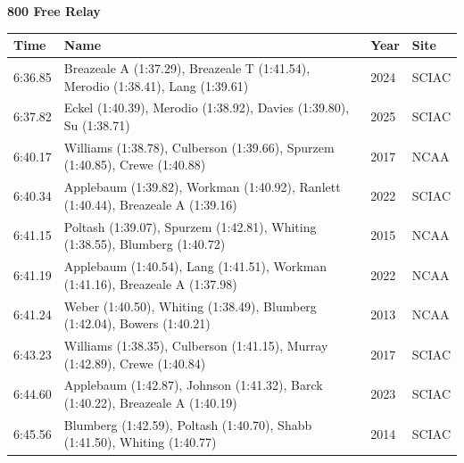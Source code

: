 \noindent\begin{minipage}[t]{0.98\textwidth}
\centering
\textbf{\textcolor{teamprimary}{800 Free Relay}}\par
\vspace{0.5em}
\centering
\small
\renewcommand{\arraystretch}{1.0}
\setlength{\tabcolsep}{4pt}
\begin{tabular}{@{}p{2.7cm}p{4.3cm}p{1.6cm}p{2.7cm}@{}}
\toprule
\textbf{Time} & \textbf{Name} & \textbf{Year} & \textbf{Site} \\
\midrule
6:36.85 & Breazeale A (1:37.29), Breazeale T (1:41.54), Merodio (1:38.41), Lang (1:39.61) & 2024 & SCIAC \\
6:37.82 & Eckel (1:40.39), Merodio (1:38.92), Davies (1:39.80), Su (1:38.71) & 2025 & SCIAC \\
6:40.17 & Williams (1:38.78), Culberson (1:39.66), Spurzem (1:40.85), Crewe (1:40.88) & 2017 & NCAA \\
6:40.34 & Applebaum (1:39.82), Workman (1:40.92), Ranlett (1:40.44), Breazeale A (1:39.16) & 2022 & SCIAC \\
6:41.15 & Poltash (1:39.07), Spurzem (1:42.81), Whiting (1:38.55), Blumberg (1:40.72) & 2015 & NCAA \\
6:41.19 & Applebaum (1:40.54), Lang (1:41.51), Workman (1:41.16), Breazeale A (1:37.98) & 2022 & NCAA \\
6:41.24 & Weber (1:40.50), Whiting (1:38.49), Blumberg (1:42.04), Bowers (1:40.21) & 2013 & NCAA \\
6:43.23 & Williams (1:38.35), Culberson (1:41.15), Murray (1:42.89), Crewe (1:40.84) & 2017 & SCIAC \\
6:44.60 & Applebaum (1:42.87), Johnson (1:41.32), Barck (1:40.22), Breazeale A (1:40.19) & 2023 & SCIAC \\
6:45.56 & Blumberg (1:42.59), Poltash (1:40.70), Shabb (1:41.50), Whiting (1:40.77) & 2014 & SCIAC \\
\bottomrule
\end{tabular}
\end{minipage}
\vspace{1.2em}
